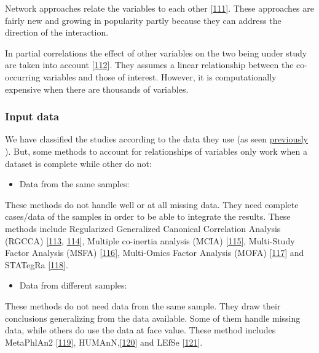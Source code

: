 \documentclass[
  a4paper,
]{book}
\providecommand{\tightlist}{%
  \setlength{\itemsep}{0pt}\setlength{\parskip}{0pt}}
\begin{document}
Network approaches relate the variables to each other {[}\protect\hyperlink{ref-koh_iomicspass_2019}{111}{]}.
These approaches are fairly new and growing in popularity partly because they can address the direction of the interaction.

In partial correlations the effect of other variables on the two being under study are taken into account {[}\protect\hyperlink{ref-yule1907}{112}{]}.
They assumes a linear relationship between the co-occurring variables and those of interest.
However, it is computationally expensive when there are thousands of variables.

\hypertarget{input-data}{%
\subsubsection{Input data}\label{input-data}}

We have classified the studies according to the data they use (as seen \protect\hyperlink{data-origin}{previously} ).
But, some methods to account for relationships of variables only work when a dataset is complete while other do not:

\begin{itemize}
\tightlist
\item
  Data from the same samples:
\end{itemize}

These methods do not handle well or at all missing data.
They need complete cases/data of the samples in order to be able to integrate the results.
These methods include Regularized Generalized Canonical Correlation Analysis (RGCCA) {[}\protect\hyperlink{ref-tenenhaus_regularized_2011}{113}, \protect\hyperlink{ref-tenenhaus_variable_2014}{114}{]}, Multiple co-inertia analysis (MCIA) {[}\protect\hyperlink{ref-culhane_cross-platform_2003}{115}{]}, Multi-Study Factor Analysis (MSFA) {[}\protect\hyperlink{ref-vito_multi-study_2019}{116}{]}, Multi-Omics Factor Analysis (MOFA) {[}\protect\hyperlink{ref-argelaguet_multi-omics_2018}{117}{]} and STATegRa {[}\protect\hyperlink{ref-gomez-cabreroSTATegraComprehensiveMultiomics2019}{118}{]}.

\begin{itemize}
\tightlist
\item
  Data from different samples:
\end{itemize}

These methods do not need data from the same sample.
They draw their conclusions generalizing from the data available.
Some of them handle missing data, while others do use the data at face value.
These method includes MetaPhlAn2 {[}\protect\hyperlink{ref-franzosaSpecieslevelFunctionalProfiling2018}{119}{]}, HUMAnN,{[}\protect\hyperlink{ref-truongMetaPhlAn2EnhancedMetagenomic2015}{120}{]} and LEfSe {[}\protect\hyperlink{ref-segataMetagenomicBiomarkerDiscovery2011}{121}{]}.
\end{document}

